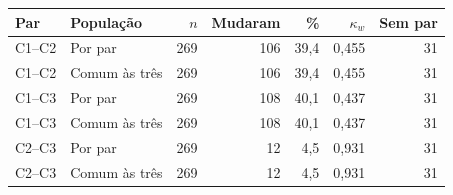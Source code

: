 \begin{tabular}{llrrrrr}
\hline
Par & População & $n$ & Mudaram & \% & $\kappa_w$ & Sem par \\
\hline
C1--C2 & Por par & 269 & 106 & 39,4 & 0,455 & 31 \\
C1--C2 & Comum às três & 269 & 106 & 39,4 & 0,455 & 31 \\
C1--C3 & Por par & 269 & 108 & 40,1 & 0,437 & 31 \\
C1--C3 & Comum às três & 269 & 108 & 40,1 & 0,437 & 31 \\
C2--C3 & Por par & 269 & 12 & 4,5 & 0,931 & 31 \\
C2--C3 & Comum às três & 269 & 12 & 4,5 & 0,931 & 31 \\
\hline
\end{tabular}

